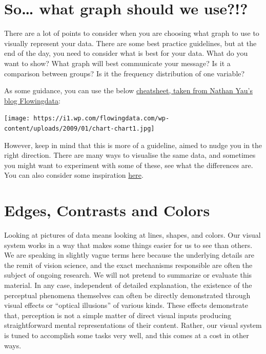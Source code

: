\documentclass[
]{book}
\begin{document}
\hypertarget{so-what-graph-should-we-use}{%
\section{So\ldots{} what graph should we use?!?}\label{so-what-graph-should-we-use}}

There are a lot of points to consider when you are choosing what graph to use to visually represent your data. There are some best practice guidelines, but at the end of the day, you need to consider what is best for your data. What do you want to show? What graph will best communicate your message? Is it a comparison between groups? Is it the frequency distribution of one variable?

As some guidance, you can use the below \href{https://flowingdata.com/2009/01/15/flow-chart-shows-you-what-chart-to-use/}{cheatsheet, taken from Nathan Yau's blog Flowingdata}:

\texttt{[image: https://i1.wp.com/flowingdata.com/wp-content/uploads/2009/01/chart-chart1.jpg]}

However, keep in mind that this is more of a guideline, aimed to nudge you in the right direction. There are many ways to visualise the same data, and sometimes you might want to experiment with some of these, see what the differences are. You can also consider some inspiration \href{http://datavizproject.com/}{here}.

\hypertarget{edges-contrasts-and-colors}{%
\section{Edges, Contrasts and Colors}\label{edges-contrasts-and-colors}}

Looking at pictures of data means looking at lines, shapes, and colors. Our visual system works in a way that makes some things easier for us to see than others. We are speaking in slightly vague terms here because the underlying details are the remit of vision science, and the exact mechanisms responsible are often the subject of ongoing research. We will not pretend to summarize or evaluate this material. In any case, independent of detailed explanation, the existence of the perceptual phenomena themselves can often be directly demonstrated through visual effects or ``optical illusions'' of various kinds. These effects demonstrate that, perception is not a simple matter of direct visual inputs producing straightforward mental representations of their content. Rather, our visual system is tuned to accomplish some tasks very well, and this comes at a cost in other ways.
\end{document}
